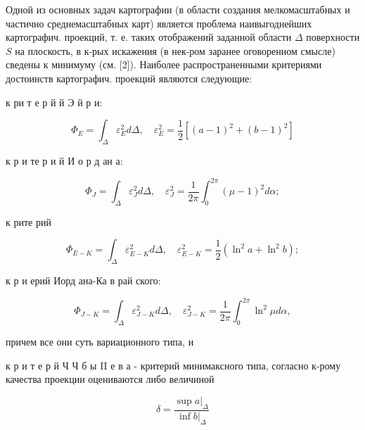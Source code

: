\documentclass[10pt]{article}
\begin{document}
Одной из основных задач картографии (в области создания мелкомасштабных и частично среднемасштабных карт) является проблема наивыгоднейших картографич. проекций, т. е. таких отображений заданной области $\Delta$ поверхности $S$ на плоскость, в к-рых искажения (в нек-ром заранее оговоренном смысле) сведены к минимуму (см. [2]). Наиболее распространенными критериями достоинств картографич. проекций являются следующие:



к ри т е р й й Э й р и:



\[

\Phi_{E}=\int_{\Delta} \varepsilon_{E}^{2} d \Delta, \quad \varepsilon_{E}^{2}=\frac{1}{2}\left[(a-1)^{2}+(b-1)^{2}\right]

\]



к р и те р и й И о р д ан а:



\[

\Phi_{J}=\int_{\Delta} \varepsilon_{J}^{2} d \Delta, \quad \varepsilon_{J}^{2}=\frac{1}{2 \pi} \int_{0}^{2 \pi}(\mu-1)^{2} d \alpha ;

\]



к рите рий



\[

\Phi_{E-K}=\int_{\Delta} \varepsilon_{E-K}^{2} d \Delta, \quad \varepsilon_{E-K}^{2}=\frac{1}{2}\left(\ln ^{2} a+\ln ^{2} b\right) ;

\]



к р и ерий Иорд ана-Ка в рай ского:



\[

\Phi_{J-K}=\int_{\Delta} \varepsilon_{J-K}^{2} d \Delta, \quad \varepsilon_{J-K}^{2}=\frac{1}{2 \pi} \int_{0}^{2 \pi} \ln ^{2} \mu d \alpha,

\]



причем все они суть вариационного типа, и



к р и т е р й Ч Ч б ы II е в а - критерий минимаксного типа, согласно к-рому качества проекции оцениваются либо величиной



\[

\delta=\frac{\left.\sup a\right|_{\Delta}}{\left.\inf b\right|_{\Delta}}

\]
\end{document}
